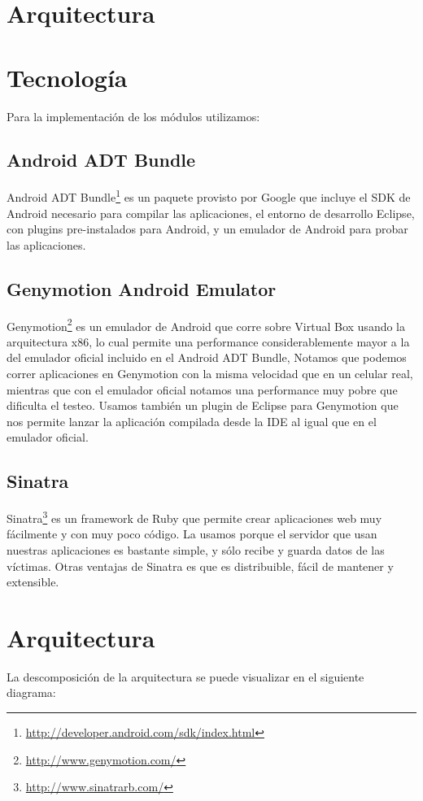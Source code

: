 \section{Arquitectura}
\section{Tecnología}
Para la implementaci\'on de los m\'odulos utilizamos:
	\subsection{Android ADT Bundle} 
		Android ADT Bundle\footnote{ \url{http://developer.android.com/sdk/index.html}} es un paquete provisto por Google que incluye el SDK de Android necesario para compilar las aplicaciones, el entorno de desarrollo Eclipse, con plugins pre-instalados para Android, y un emulador de Android para probar las aplicaciones.
		
	\subsection{Genymotion Android Emulator}
		Genymotion\footnote{\url{http://www.genymotion.com/}} es un emulador de Android que corre sobre Virtual Box usando la arquitectura x86, lo cual permite una performance considerablemente mayor a la del emulador oficial incluido en el Android ADT Bundle, Notamos que podemos correr aplicaciones en Genymotion con la misma velocidad que en un celular real, mientras que con el emulador oficial notamos una performance muy pobre que dificulta el testeo. Usamos también un plugin de Eclipse para Genymotion que nos permite lanzar la aplicación compilada desde la IDE al igual que en el emulador oficial.
		
	\subsection{Sinatra}
		Sinatra\footnote{\url{http://www.sinatrarb.com/}} es un framework de Ruby que permite crear aplicaciones web muy fácilmente y con muy poco código. La usamos porque el servidor que usan nuestras aplicaciones es bastante simple, y sólo recibe y guarda datos de las víctimas. Otras ventajas de Sinatra es que es distribuible, fácil de mantener y extensible.

\section{Arquitectura}
La descomposici\'on de la arquitectura se puede visualizar en el siguiente diagrama:

